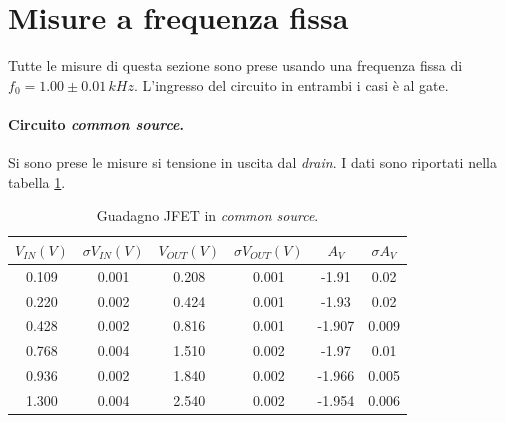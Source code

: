 \documentclass[10pt,a4paper]{article}
\begin{document}
\section{Misure a frequenza fissa}
Tutte le misure di questa sezione sono prese usando una frequenza fissa di $f_0 = 1.00\pm0.01\, kHz$. L'ingresso del circuito in entrambi i casi è al gate.
\paragraph{Circuito \emph{common source}.}
Si sono prese le misure si tensione in uscita dal \emph{drain}. I dati sono riportati nella tabella \ref{tabellaCommonSource}.

\begin{table}[!htb]\centering
\begin{tabular}{|c|c|c|c|c|c|}
\hline
$V_{IN} (V)$ & $\sigma V_{IN} (V)$ & $V_{OUT} (V)$ & $\sigma V_{OUT} (V)$ & $A_V$ & $\sigma A_V$\\
\hline
0.109 & 0.001 & 0.208 & 0.001 & -1.91 & 0.02\\
0.220 & 0.002 & 0.424 & 0.001 & -1.93 & 0.02\\
0.428 & 0.002 & 0.816 & 0.001 & -1.907 & 0.009\\
0.768 & 0.004 & 1.510 & 0.002 & -1.97 & 0.01\\
0.936 & 0.002 & 1.840 & 0.002 & -1.966 & 0.005\\
1.300 & 0.004 & 2.540 & 0.002 & -1.954 & 0.006\\
\hline
\end{tabular}
\caption{Guadagno JFET in \emph{common source}.}
\label{tabellaCommonSource}
\end{table}
\end{document}
